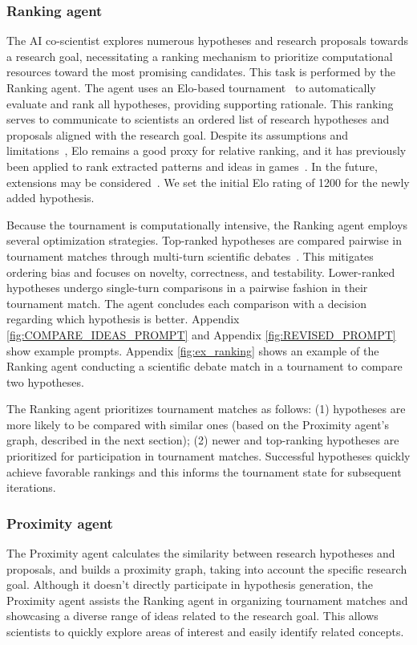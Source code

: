 \subsubsection{Ranking agent}
The AI co-scientist explores numerous hypotheses and research proposals towards a research goal, necessitating a ranking mechanism to prioritize computational resources toward the most promising candidates. This task is performed by the Ranking agent. The agent uses an Elo-based tournament~\citep{elo1978rating} to automatically evaluate and rank all hypotheses, providing supporting rationale. This ranking serves to communicate to scientists an ordered list of research hypotheses and proposals aligned with the research goal. Despite its assumptions and limitations~\cite{hamilton2024elo}, Elo remains a good proxy for relative ranking, and it has previously been applied to rank extracted patterns and ideas in games~\cite{coulom2007computing}. In the future, extensions may be considered~\cite{kovalchik2020extension}. We set the initial Elo rating of 1200 for the newly added hypothesis.

Because the tournament is computationally intensive, the Ranking agent employs several optimization strategies. Top-ranked hypotheses are compared pairwise in tournament matches through multi-turn scientific debates~\citep{khan2024debating}. This mitigates ordering bias and focuses on novelty, correctness, and testability. Lower-ranked hypotheses undergo single-turn comparisons in a pairwise fashion in their tournament match. The agent concludes each comparison with a decision regarding which hypothesis is better. Appendix \cref{fig:COMPARE_IDEAS_PROMPT} and Appendix \cref{fig:REVISED_PROMPT} show example prompts. Appendix \cref{fig:ex_ranking} shows an example of the Ranking agent conducting a scientific debate match in a tournament to compare two hypotheses.

The Ranking agent prioritizes tournament matches as follows: (1) hypotheses are more likely to be compared with similar ones (based on the Proximity agent's graph, described in the next section); (2) newer and top-ranking hypotheses are prioritized for participation in tournament matches. Successful hypotheses quickly achieve favorable rankings and this informs the tournament state for subsequent iterations.


\subsubsection{Proximity agent}
The Proximity agent calculates the similarity between research hypotheses and proposals, and builds a proximity graph, taking into account the specific research goal. Although it doesn't directly participate in hypothesis generation, the Proximity agent assists the Ranking agent in organizing tournament matches and showcasing a diverse range of ideas related to the research goal. This allows scientists to quickly explore areas of interest and easily identify related concepts.


